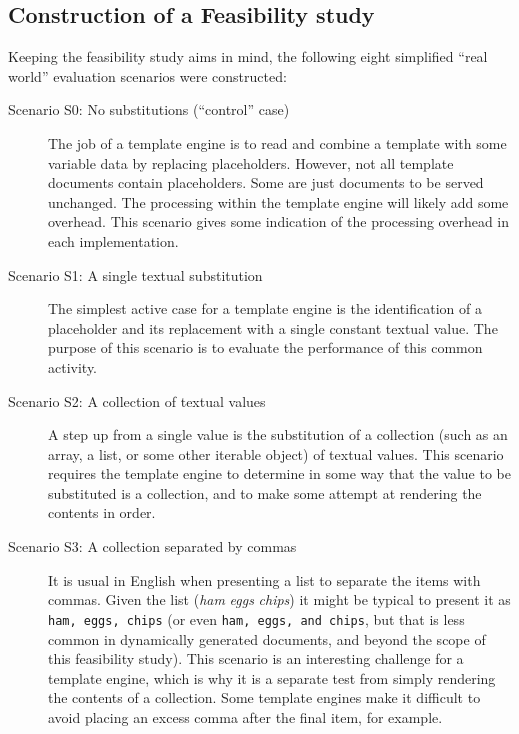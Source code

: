 \subsection{Construction of a Feasibility study}
\label{fs:construction}

Keeping the feasibility study aims in mind, the following eight simplified \enquote{real world} evaluation scenarios were constructed:

\begin{description}
\item[Scenario S0: No substitutions (\enquote{control} case)] \hfill

The job of a \gls{template engine} is to read and combine a template with some variable data by replacing placeholders. However, not all template documents contain placeholders. Some are just documents to be served unchanged. The processing within the \gls{template engine} will likely add some overhead. This scenario gives some indication of the processing overhead in each implementation.

\item[Scenario S1: A single textual substitution] \hfill

The simplest active case for a \gls{template engine} is the identification of a placeholder and its replacement with a single constant textual value. The purpose of this scenario is to evaluate the performance of this common activity.

\item[Scenario S2: A collection of textual values] \hfill

A step up from a single value is the substitution of a collection (such as an array, a list, or some other iterable object) of textual values. This scenario requires the \gls{template engine} to determine in some way that the value to be substituted is a collection, and to make some attempt at rendering the contents in order.

\item[Scenario S3: A collection separated by commas] \hfill

It is usual in English when presenting a list to separate the items with commas. Given the list (\emph{ham} \emph{eggs} \emph{chips}) it might be typical to present it as \texttt{ham, eggs, chips} (or even \texttt{ham, eggs, and chips}, but that is less common in dynamically generated documents, and beyond the scope of this feasibility study). This scenario is an interesting challenge for a \gls{template engine}, which is why it is a separate test from simply rendering the contents of a collection. Some \gls{template engine}s make it difficult to avoid placing an excess comma after the final item, for example.


\end{description}
